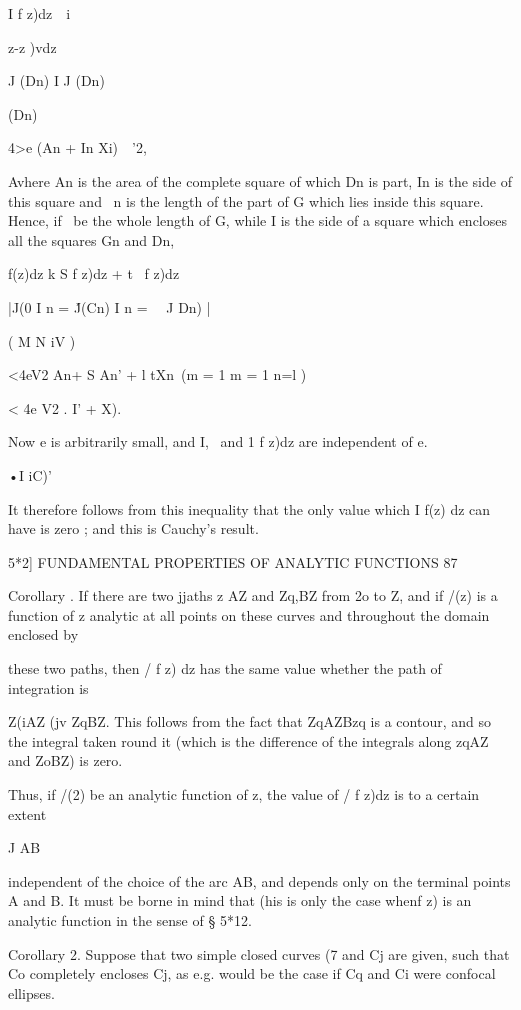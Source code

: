 I f z)dz\ \ i \ \ {z-z )vdz\

J (Dn) I J (Dn)



(Dn)

  4>e (An + In Xi)\ \ '2,

Avhere An is the area of the complete square of which Dn is part, In
is the side of this square and \ n is the length of the part of G
which lies inside this square. Hence, if \ be the whole length of G,
while I is the side of a square which encloses all the squares Gn and
Dn,

f(z)dz k S f z)dz + t \ f z)dz

|J(0 I n = \'J(Cn) I n = \ \ J Dn) |

( M N iV )

<4eV2 An+ S An' + l tXn\ (m = 1 m = 1 n=l )

< 4e V2 . I' + X).

Now e is arbitrarily small, and I, \ and 1 f z)dz are independent of
e.

•I iC)'

It therefore follows from this inequality that the only value which I
f(z) dz can have is zero ; and this is Cauchy's result.



5*2] FUNDAMENTAL PROPERTIES OF ANALYTIC FUNCTIONS 87

Corollary . If there are two jjaths z AZ and Zq,BZ from 2o to Z, and
if /(z) is a function of z analytic at all points on these curves and
throughout the domain enclosed by

these two paths, then / f z) dz has the same value whether the path of
integration is

Z(iAZ (jv ZqBZ. This follows from the fact that ZqAZBzq is a contour,
and so the integral taken round it (which is the difference of the
integrals along zqAZ and ZoBZ) is zero.

Thus, if /(2) be an analytic function of z, the value of / f z)dz is
to a certain extent

J AB

independent of the choice of the arc AB, and depends only on the
terminal points A and B. It must be borne in mind that (his is only
the case whenf z) is an analytic function in the sense of § 5*12.

Corollary 2. Suppose that two simple closed curves (7 and Cj are
given, such that Co completely encloses Cj, as e.g. would be the case
if Cq and Ci were confocal ellipses.

}

